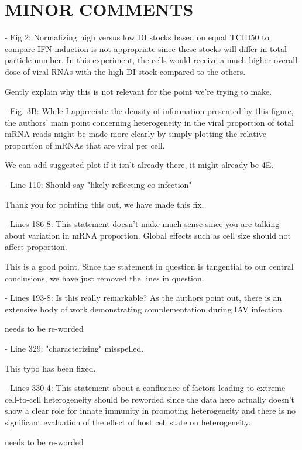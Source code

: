 \documentclass[11pt, oneside]{article}   	%
\begin{document}
\section*{MINOR COMMENTS}

- Fig 2: Normalizing high versus low DI stocks based on equal TCID50 to compare IFN induction is not appropriate since these stocks will differ in total particle number. In this experiment, the cells would receive a much higher overall dose of viral RNAs with the high DI stock compared to the others. 

{\color{red}
Gently explain why this is not relevant for the point we're trying to make.
}

- Fig. 3B: While I appreciate the density of information presented by this figure, the authors' main point concerning heterogeneity in the viral proportion of total mRNA reads might be made more clearly by simply plotting the relative proportion of mRNAs that are viral per cell. 

{\color{red}
We can add suggested plot if it isn't already there, it might already be 4E.
}

- Line 110: Should say "likely reflecting co-infection" 

{\color{black}
Thank you for pointing this out, we have made this fix.}

- Lines 186-8: This statement doesn't make much sense since you are talking about variation in mRNA proportion. Global effects such as cell size should not affect proportion. 

{\color{black}
This is a good point. 
Since the statement in question is tangential to our central conclusions, we have just removed the lines in question.
}

- Lines 193-8: Is this really remarkable? As the authors point out, there is an extensive body of work demonstrating complementation during IAV infection. 

{\color{red} needs to be re-worded}

- Line 329: "characterizing" misspelled. 

{\color{black}
This typo has been fixed.
}

- Lines 330-4: This statement about a confluence of factors leading to extreme cell-to-cell heterogeneity should be reworded since the data here actually doesn't show a clear role for innate immunity in promoting heterogeneity and there is no significant evaluation of the effect of host cell state on heterogeneity. 

{\color{red} needs to be re-worded}
\end{document}

